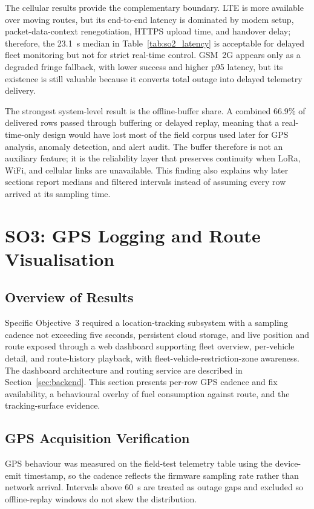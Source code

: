The cellular results provide the complementary boundary. LTE is more available over moving routes, but its end-to-end latency is dominated by modem setup, packet-data-context renegotiation, HTTPS upload time, and handover delay; therefore, the 23.1~s median in Table~\ref{tab:so2_latency} is acceptable for delayed fleet monitoring but not for strict real-time control. GSM~2G appears only as a degraded fringe fallback, with lower success and higher p95 latency, but its existence is still valuable because it converts total outage into delayed telemetry delivery.


The strongest system-level result is the offline-buffer share. A combined 66.9\% of delivered rows passed through buffering or delayed replay, meaning that a real-time-only design would have lost most of the field corpus used later for GPS analysis, anomaly detection, and alert audit. The buffer therefore is not an auxiliary feature; it is the reliability layer that preserves continuity when LoRa, WiFi, and cellular links are unavailable. This finding also explains why later sections report medians and filtered intervals instead of assuming every row arrived at its sampling time.

\section{SO3: GPS Logging and Route Visualisation}
\label{sec:results_so3}

\subsection{Overview of Results}
Specific Objective~3 required a location-tracking subsystem with a sampling cadence not exceeding five seconds, persistent cloud storage, and live position and route exposed through a web dashboard supporting fleet overview, per-vehicle detail, and route-history playback, with fleet-vehicle-restriction-zone awareness. The dashboard architecture and routing service are described in Section~\ref{sec:backend}. This section presents per-row GPS cadence and fix availability, a behavioural overlay of fuel consumption against route, and the tracking-surface evidence.

\subsection{GPS Acquisition Verification}
GPS behaviour was measured on the field-test telemetry table using the device-emit timestamp, so the cadence reflects the firmware sampling rate rather than network arrival. Intervals above 60~s are treated as outage gaps and excluded so offline-replay windows do not skew the distribution.

